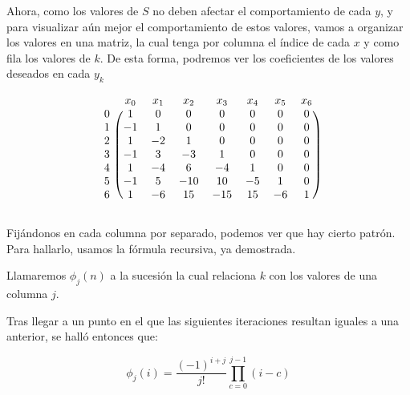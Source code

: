 Ahora, como los valores de $S$ no deben afectar el comportamiento de cada $y$, y para visualizar
aún mejor el comportamiento de estos valores, vamos a organizar los valores en una matriz,
la cual tenga por columna el índice de cada $x$ y como fila los valores de $k$. De esta forma,
podremos ver los coeficientes de los valores deseados en cada $y_k$

\[
\begin{blockarray}{cccccccc}
        & x_0     & x_1   & x_2   & x_3   & x_4   & x_5   & x_6\\
    \begin{block}{c(ccccccc)}
    0   &   1     & 0     & 0     & 0     & 0     & 0     & 0\\
    1   &   -1    & 1     & 0     & 0     & 0     & 0     & 0\\
    2   &   1     & -2    & 1     & 0     & 0     & 0     & 0\\
    3   &   -1    & 3     & -3    & 1     & 0     & 0     & 0\\
    4   &   1     & -4    & 6     & -4    & 1     & 0     & 0\\
    5   &   -1    & 5     & -10   & 10    & -5    & 1     & 0\\
    6   &   1     & -6    & 15    & -15   & 15    & -6    & 1\\
    \end{block}
\end{blockarray}
\]

Fijándonos en cada columna por separado, podemos ver que hay cierto
patrón. Para hallarlo, usamos la fórmula recursiva, ya demostrada.

Llamaremos $\phi_j(n)$ a la sucesión la cual relaciona $k$ con los valores
de una columna $j$.

Tras llegar a un punto en el que las siguientes iteraciones resultan iguales a una
anterior, se halló entonces que:

\[\phi_j(i) = \dfrac{(-1)^{i + j}}{j!}\prod_{c=0}^{j-1}(i - c)\]

